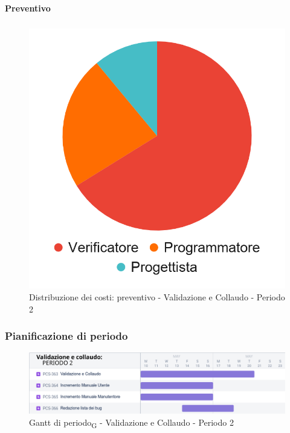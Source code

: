 \paragraph{Preventivo}
\subparagraph*{}

\hspace{-1cm}
\begin{minipage}{.50\textwidth}
\smallPreventivoTable{
	
}
\end{minipage}
\hspace{1cm}
\begin{minipage}{.40\textwidth}
\begin{figure}[H]
	\includegraphics[scale=0.21]{res/images/charts/preventivo_priori/Grafico4-10.png}
	\caption{Distribuzione dei costi: preventivo - Validazione e Collaudo - Periodo 2}
\end{figure}
\end{minipage} 




\subsubsection{Pianificazione di periodo}


\begin{figure}[H]
	\centering
	\includegraphics[scale=0.55]{res/images/gantt_periodo/valid_2_gantt.png}
	\caption{Gantt di periodo\textsubscript{G} - Validazione e Collaudo - Periodo 2}
\end{figure}

